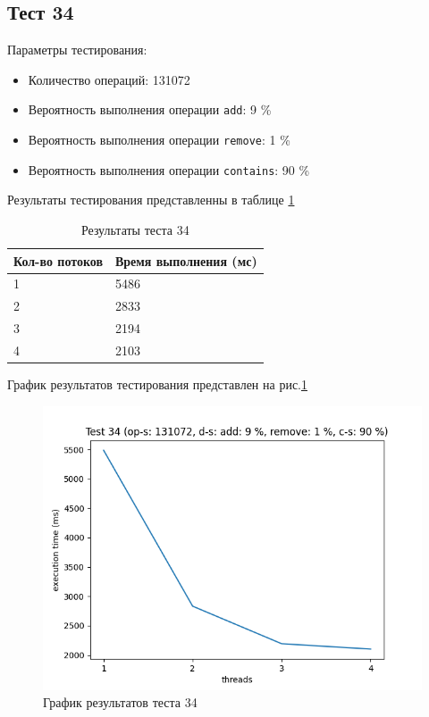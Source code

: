 \subsection*{Тест 34}

Параметры тестирования:

\begin{itemize}
    \item Количество операций: 131072
    \item Вероятность выполнения операции \verb|add|: 9 \%
    \item Вероятность выполнения операции \verb|remove|: 1 \%
    \item Вероятность выполнения операции \verb|contains|: 90 \%
\end{itemize}

Результаты тестирования представленны в таблице \ref{tab:results34}


\begin{table}[H]
    \centering
    \begin{tabular}{|l|l|}
        \hline
        Кол-во потоков & Время выполнения (мс) \\
        \hline
        1 & 5486 \\
        \hline
        2 & 2833 \\
        \hline
        3 & 2194 \\
        \hline
        4 & 2103 \\
        \hline
    \end{tabular}
    \caption{Результаты теста 34}
    \label{tab:results34}
\end{table}
        

График результатов тестирования представлен на рис.\ref{fig:plot34}

\begin{figure}[H]
    \centering
    \includegraphics[width=0.7\linewidth]{photo/plot34}
    \caption{График результатов теста 34}
    \label{fig:plot34}
\end{figure}

